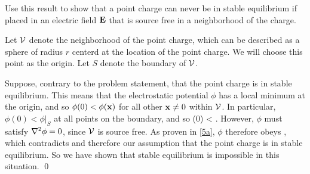 \begin{problem}
	Use this result to show that a point charge can never be in stable equilibrium if placed in an electric field $\mathbf{E}$ that is source free in a neighborhood of the charge.
\end{problem}

\begin{solution}
	Let $\mathcal{V}$ denote the neighborhood of the point charge, which can be described as a sphere of radius $r$ centerd at the location of the point charge.  We will choose this point as the origin.  Let $S$ denote the boundary of $\mathcal{V}$.
	
	Suppose, contrary to the problem statement, that the point charge is in stable equilibrium.  This means that the electrostatic potential $\phi$ has a local minimum at the origin, and so $\phi(0) < \phi(\mathbf{x})$ for all other $\mathbf{x} \neq 0$ within $\mathcal{V}$.  In particular, $\phi(0) < \phi|_S$ at all points on the boundary, and so
	\beqn \label{fake}
		\phi(0) <  \intS \phix \dS.
	\eeqn
	However, $\phi$ must satisfy $\nabla^2\phi = 0$, since $\mathcal{V}$ is source free.  As proven in \ref{5a}, $\phi$ therefore obeys , which contradicts  and therefore our assumption that the point charge is in stable equilibrium.  So we have shown that stable equilibrium is impossible in this situation. \qed
\end{solution}